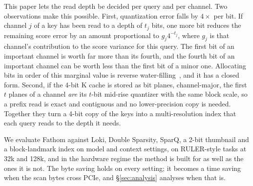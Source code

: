 \documentclass[10pt,twocolumn]{article}
\newcommand{\ours}{Fathom}
\begin{document}
This paper lets the read depth be decided per query and per channel. Two observations make this possible. First, quantization error falls by $4\times$ per bit. If channel $j$ of a key has been read to a depth of $t_j$ bits, one more bit reduces the remaining score error by an amount proportional to $g_j4^{-t_j}$, where $g_j$ is that channel's contribution to the score variance for this query. The first bit of an important channel is worth far more than its fourth, and the fourth bit of an important channel can be worth less than the first bit of a minor one. Allocating bits in order of this marginal value is reverse water-filling~\cite{gershogray}, and it has a closed form. Second, if the 4-bit K cache is stored as bit planes, channel-major, the first $t$ planes of a channel \emph{are} its $t$-bit mid-rise quantizer with the same block scale, so a prefix read is exact and contiguous and no lower-precision copy is needed. Together they turn a 4-bit copy of the keys into a multi-resolution index that each query reads to the depth it needs.

We evaluate \ours{} against Loki, Double Sparsity, SparQ, a 2-bit thumbnail and a block-landmark index on \nSettings{} model and context settings, on RULER-style tasks at 32k and 128k, and in the hardware regime the method is built for as well as the ones it is not. The byte saving holds on every setting; it becomes a time saving when the scan bytes cross PCIe, and \S\ref{sec:analysis} analyses when that is.
\end{document}
